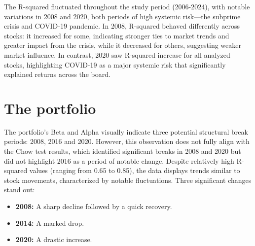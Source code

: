The R-squared fluctuated throughout the study period (2006-2024), with notable variations in 2008 and 2020, both periods of 
high systemic risk—the subprime crisis and COVID-19 pandemic.
In 2008, R-squared behaved differently across stocks: it increased for some, indicating stronger ties to market trends and
greater impact from the crisis, while it decreased for others, suggesting weaker market influence.
In contrast, 2020 saw R-squared increase for all analyzed stocks, highlighting COVID-19 as a major systemic risk that 
significantly explained returns across the board.

\section{The portfolio}
The portfolio's Beta and Alpha visually indicate three potential structural break periods: 2008, 2016 and 2020. 
However, this observation does not fully align with the Chow test results, which identified significant breaks in 2008 and
2020 but did not highlight 2016 as a period of notable change. 
Despite relatively high R-squared values (ranging from 0.65 to 0.85), the data displays trends similar to stock movements, 
characterized by notable fluctuations.
Three significant changes stand out:
\begin{itemize}
    \item \textbf{2008:} A sharp decline followed by a quick recovery.
    \item \textbf{2014:} A marked drop.
    \item \textbf{2020:} A drastic increase.
\end{itemize}